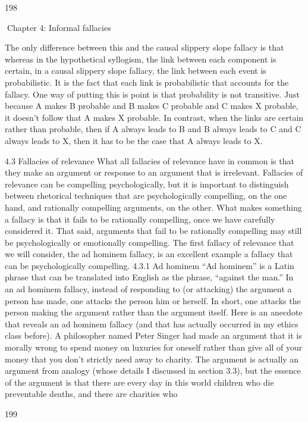 198

Chapter 4: Informal fallacies

The only difference between this and the causal slippery slope fallacy is that
whereas in the hypothetical syllogism, the link between each component is
certain, in a causal slippery slope fallacy, the link between each event is
probabilistic. It is the fact that each link is probabilistic that accounts for the
fallacy. One way of putting this is point is that probability is not transitive. Just
because A makes B probable and B makes C probable and C makes X probable,
it doesn’t follow that A makes X probable. In contrast, when the links are certain
rather than probable, then if A always leads to B and B always leads to C and C
always leads to X, then it has to be the case that A always leads to X.

4.3 Fallacies of relevance
What all fallacies of relevance have in common is that they make an argument or
response to an argument that is irrelevant. Fallacies of relevance can be
compelling psychologically, but it is important to distinguish between rhetorical
techniques that are psychologically compelling, on the one hand, and rationally
compelling arguments, on the other. What makes something a fallacy is that it
fails to be rationally compelling, once we have carefully considered it. That said,
arguments that fail to be rationally compelling may still be psychologically or
emotionally compelling. The first fallacy of relevance that we will consider, the
ad hominem fallacy, is an excellent example a fallacy that can be psychologically
compelling.
4.3.1 Ad hominem
“Ad hominem” is a Latin phrase that can be translated into English as the phrase,
“against the man.” In an ad hominem fallacy, instead of responding to (or
attacking) the argument a person has made, one attacks the person him or
herself. In short, one attacks the person making the argument rather than the
argument itself. Here is an anecdote that reveals an ad hominem fallacy (and
that has actually occurred in my ethics class before).
A philosopher named Peter Singer had made an argument that it is
morally wrong to spend money on luxuries for oneself rather than give all
of your money that you don’t strictly need away to charity. The argument
is actually an argument from analogy (whose details I discussed in section
3.3), but the essence of the argument is that there are every day in this
world children who die preventable deaths, and there are charities who

199


